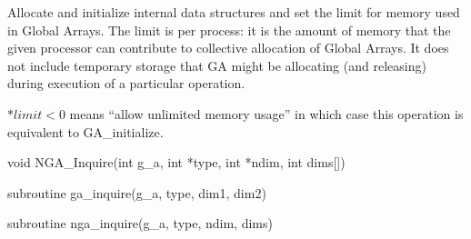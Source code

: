 \documentclass[12pt]{article}
\begin{document}
\gcoll

\begin{desc}

Allocate and initialize internal data structures and set the limit for memory
used in Global Arrays. The limit is per process: it is the amount of memory
that the given processor can contribute to collective allocation of Global
Arrays. It does not include temporary storage that GA might be allocating (and
releasing) during execution of a particular operation.

$*limit < 0$ means ``allow unlimited memory usage'' in which case this operation
is equivalent to GA_initialize.

\end{desc}



\begin{capi}
\begin{ccode}
void NGA_Inquire(int g_a, int *type, int *ndim, int dims[])
\end{ccode}
\begin{funcargs}
\end{funcargs}
\end{capi}

\begin{f2dapi}
\begin{fcode}
subroutine ga_inquire(g_a, type, dim1, dim2)
\end{fcode}
\begin{funcargs}
\end{funcargs}
\end{f2dapi}

\begin{fapi}
\begin{fcode}
subroutine nga_inquire(g_a, type, ndim, dims)
\end{fcode}
\begin{funcargs}
\end{funcargs}
\end{fapi}
\end{document}
